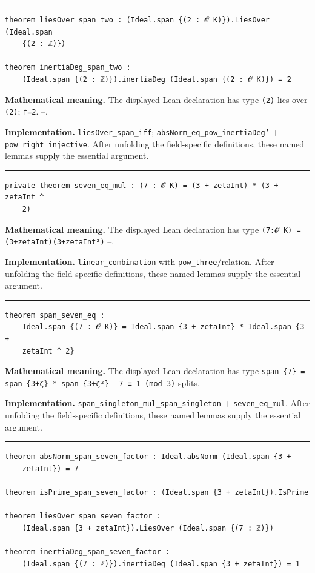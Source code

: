 \documentclass[UTF8,a4paper,11pt,fontset=fandol]{ctexart}
\theoremstyle{definition}
\newcommand{\statementsep}{\par\medskip\hrule\medskip}
\begin{document}
\statementsep
\begin{verbatim}
theorem liesOver_span_two : (Ideal.span {(2 : 𝓞 K)}).LiesOver (Ideal.span
    {(2 : ℤ)})

theorem inertiaDeg_span_two :
    (Ideal.span {(2 : ℤ)}).inertiaDeg (Ideal.span {(2 : 𝓞 K)}) = 2
\end{verbatim}
\noindent\textbf{Mathematical meaning.} The displayed Lean declaration has type \texttt{(2)} lies over \texttt{(2)}; \texttt{f=2}. --.\par
\noindent\textbf{Implementation.} \texttt{liesOver\_\allowbreak{}span\_\allowbreak{}iff}; \texttt{absNorm\_\allowbreak{}eq\_\allowbreak{}pow\_\allowbreak{}inertiaDeg'} + \texttt{pow\_\allowbreak{}right\_\allowbreak{}injective}. After unfolding the field-specific definitions, these named lemmas supply the essential argument.\par
\statementsep
\begin{verbatim}
private theorem seven_eq_mul : (7 : 𝓞 K) = (3 + zetaInt) * (3 + zetaInt ^
    2)
\end{verbatim}
\noindent\textbf{Mathematical meaning.} The displayed Lean declaration has type \texttt{(7:𝓞 K) = (3+zetaInt)(3+zetaInt²)} --.\par
\noindent\textbf{Implementation.} \texttt{linear\_\allowbreak{}combination} with \texttt{pow\_\allowbreak{}three}/relation. After unfolding the field-specific definitions, these named lemmas supply the essential argument.\par
\statementsep
\begin{verbatim}
theorem span_seven_eq :
    Ideal.span {(7 : 𝓞 K)} = Ideal.span {3 + zetaInt} * Ideal.span {3 +
    zetaInt ^ 2}
\end{verbatim}
\noindent\textbf{Mathematical meaning.} The displayed Lean declaration has type \texttt{span \{7\} = span \{3+ζ\} * span \{3+ζ²\}} -- \texttt{7 ≡ 1 (mod 3)} splits.\par
\noindent\textbf{Implementation.} \texttt{span\_\allowbreak{}singleton\_\allowbreak{}mul\_\allowbreak{}span\_\allowbreak{}singleton} + \texttt{seven\_\allowbreak{}eq\_\allowbreak{}mul}. After unfolding the field-specific definitions, these named lemmas supply the essential argument.\par
\statementsep
\begin{verbatim}
theorem absNorm_span_seven_factor : Ideal.absNorm (Ideal.span {3 +
    zetaInt}) = 7

theorem isPrime_span_seven_factor : (Ideal.span {3 + zetaInt}).IsPrime

theorem liesOver_span_seven_factor :
    (Ideal.span {3 + zetaInt}).LiesOver (Ideal.span {(7 : ℤ)})

theorem inertiaDeg_span_seven_factor :
    (Ideal.span {(7 : ℤ)}).inertiaDeg (Ideal.span {3 + zetaInt}) = 1
\end{verbatim}
\end{document}
